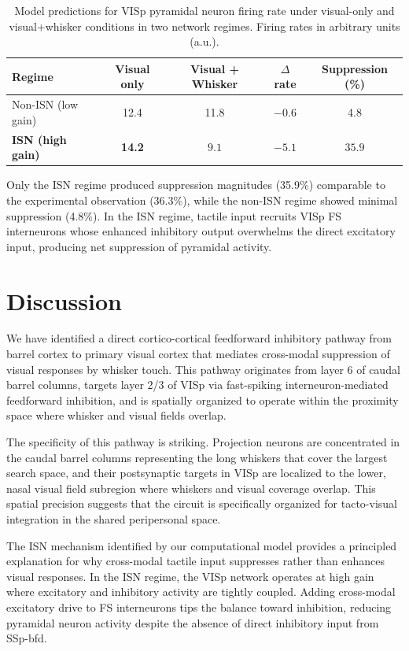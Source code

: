 \documentclass[11pt]{article}
\begin{document}
\begin{table}[H]
\centering
\caption{Model predictions for VISp pyramidal neuron firing rate under visual-only and visual+whisker conditions in two network regimes. Firing rates in arbitrary units (a.u.).}
\label{tab:model}
\begin{tabular}{lcccc}
\toprule
\textbf{Regime} & \textbf{Visual only} & \textbf{Visual + Whisker} & \textbf{$\Delta$ rate} & \textbf{Suppression (\%)} \\
\midrule
Non-ISN (low gain) & 12.4 & 11.8 & $-0.6$ & 4.8 \\
\textbf{ISN (high gain)} & \textbf{14.2} & $\mathbf{9.1}$ & $\mathbf{-5.1}$ & $\mathbf{35.9}$ \\
\bottomrule
\end{tabular}
\end{table}

Only the ISN regime produced suppression magnitudes (35.9\%) comparable to the experimental observation (36.3\%), while the non-ISN regime showed minimal suppression (4.8\%). In the ISN regime, tactile input recruits VISp FS interneurons whose enhanced inhibitory output overwhelms the direct excitatory input, producing net suppression of pyramidal activity.

\section{Discussion}

We have identified a direct cortico-cortical feedforward inhibitory pathway from barrel cortex to primary visual cortex that mediates cross-modal suppression of visual responses by whisker touch. This pathway originates from layer 6 of caudal barrel columns, targets layer 2/3 of VISp via fast-spiking interneuron-mediated feedforward inhibition, and is spatially organized to operate within the proximity space where whisker and visual fields overlap.

The specificity of this pathway is striking. Projection neurons are concentrated in the caudal barrel columns representing the long whiskers that cover the largest search space, and their postsynaptic targets in VISp are localized to the lower, nasal visual field subregion where whiskers and visual coverage overlap. This spatial precision suggests that the circuit is specifically organized for tacto-visual integration in the shared peripersonal space.

The ISN mechanism identified by our computational model \citep{tsodyks1997, ozeki2009} provides a principled explanation for why cross-modal tactile input suppresses rather than enhances visual responses. In the ISN regime, the VISp network operates at high gain where excitatory and inhibitory activity are tightly coupled. Adding cross-modal excitatory drive to FS interneurons tips the balance toward inhibition, reducing pyramidal neuron activity despite the absence of direct inhibitory input from SSp-bfd.
\end{document}
